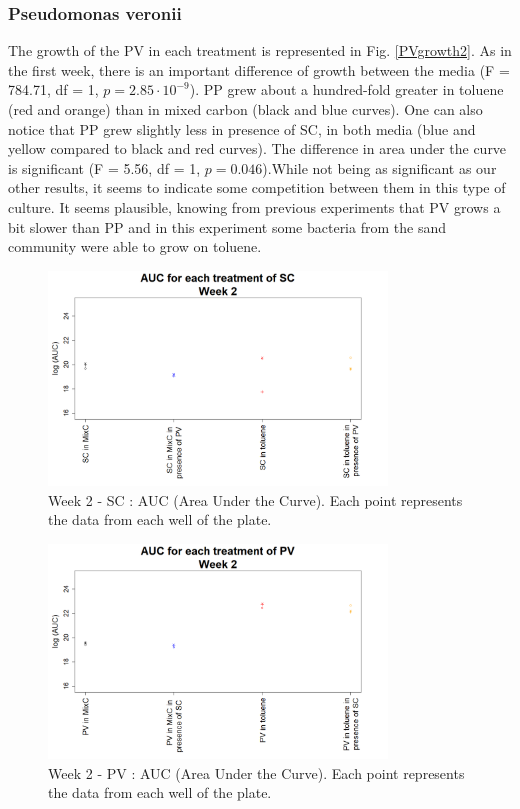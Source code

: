 \documentclass[a4paper, 10pt, conference]{ieeeconf}   %
\begin{document}
\subsubsection{Pseudomonas veronii}
The growth of the PV in each treatment is represented in Fig. \ref{PVgrowth2}.
As in the first week, there is an important difference of growth between the media (F = 784.71, df = 1, $p = 2.85 \cdot 10^{-9}$). PP grew about a hundred-fold greater in toluene (red and orange) than in mixed carbon (black and blue curves).
One can also notice that PP grew slightly less in presence of SC, in both media (blue and yellow compared to black and red curves). The difference in area under the curve is significant (F = 5.56, df = 1, $p = 0.046$).While not being as significant as our other results, it seems to indicate some competition between them in this type of culture. It seems plausible, knowing from previous experiments that PV grows a bit slower than PP and in this experiment some bacteria from the sand community were able to grow on toluene.
\newline

\begin{figure}[H]
	\centering
	\includegraphics[width=9cm]{AUCsc2.png}
	\caption{Week 2 - SC : AUC (Area Under the Curve). Each point represents the data from each well of the plate.}
	\label{aucscw2}
\end{figure}

\begin{figure}[H]
	\centering
	\includegraphics[width=9cm]{AUCpv2.png}
	\caption{Week 2 - PV : AUC (Area Under the Curve). Each point represents the data from each well of the plate.}
	\label{aucpvw2}
\end{figure}
\end{document}
